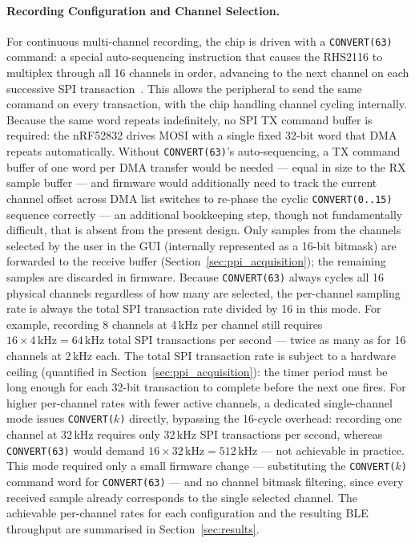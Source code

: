 \paragraph{Recording Configuration and Channel Selection.}
For continuous multi-channel recording, the chip is driven with a
\texttt{CONVERT(63)} command: a special auto-sequencing instruction that causes the
RHS2116 to multiplex through all 16 channels in order, advancing to the next channel
on each successive SPI transaction~\cite{intan_rhs2116_datasheet}. This allows the
peripheral to send the same command on every transaction, with the
chip handling channel cycling internally. Because the same word repeats indefinitely,
no SPI TX command buffer is required: the nRF52832 drives MOSI with a single fixed
32-bit word that DMA repeats automatically. Without \texttt{CONVERT(63)}'s
auto-sequencing, a TX command buffer of one word per DMA transfer would be needed ---
equal in size to the RX sample buffer --- and firmware would additionally need to
track the current channel offset across DMA list switches to re-phase the cyclic
\texttt{CONVERT(0..15)} sequence correctly --- an additional bookkeeping step, though
not fundamentally difficult, that is absent from the present design. Only samples from the channels selected by the user in the GUI
(internally represented as a 16-bit bitmask) are forwarded to the receive buffer
(Section~\ref{sec:ppi_acquisition}); the remaining samples are discarded in firmware.
Because \texttt{CONVERT(63)} always cycles all 16 physical channels regardless of how
many are selected, the per-channel sampling rate is always the total SPI transaction
rate divided by 16 in this mode. For example, recording 8 channels at 4\,kHz per
channel still requires $16 \times 4\,\text{kHz} = 64\,\text{kHz}$ total SPI
transactions per second --- twice as many as for 16 channels at 2\,kHz each. The
total SPI transaction rate is subject to a hardware ceiling (quantified in
Section~\ref{sec:ppi_acquisition}): the timer period must be long enough for each
32-bit transaction to complete before the next one fires. For higher per-channel rates
with fewer active channels, a dedicated single-channel mode issues
\texttt{CONVERT($k$)} directly, bypassing the 16-cycle overhead: recording one channel
at 32\,kHz requires only 32\,kHz SPI transactions per second, whereas
\texttt{CONVERT(63)} would demand $16 \times 32\,\text{kHz} = 512\,\text{kHz}$ ---
not achievable in practice. This mode required only a small firmware change ---
substituting the \texttt{CONVERT($k$)} command word for \texttt{CONVERT(63)} --- and no
channel bitmask filtering, since every received sample already corresponds to the
single selected channel. The
achievable per-channel rates for each configuration and the resulting BLE throughput
are summarised in Section~\ref{sec:results}.


